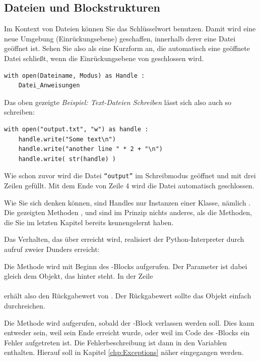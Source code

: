 \subsection{Dateien und Blockstrukturen}
Im Kontext von Dateien können Sie das Schlüsselwort  benutzen. Damit wird eine neue Umgebung (Einrückungsebene) geschaffen, innerhalb derer eine Datei geöffnet ist. Sehen Sie also  als eine Kurzform an, die automatisch eine geöffnete Datei schließt, wenn die Einrückungsebene von  geschlossen wird.

\begin{codebox}
\begin{verbatim}
with open(Dateiname, Modus) as Handle :
    Datei_Anweisungen
\end{verbatim}
\end{codebox}

Das oben gezeigte \emph{Beispiel: Text-Dateien Schreiben} lässt sich also auch so schreiben:
\begin{codebox}
\begin{verbatim}
with open("output.txt", "w") as handle :
    handle.write("Some text\n")
    handle.write("another line " * 2 + "\n")
    handle.write( str(handle) )
\end{verbatim}
\end{codebox}

Wie schon zuvor wird die Datei \texttt{\enquote{output}} im Schreibmodus geöffnet und mit drei Zeilen gefüllt. Mit dem Ende von Zeile 4 wird die Datei automatisch geschlossen.

\begin{hintbox}
Wie Sie sich denken können, sind Handles nur Instanzen einer Klasse, nämlich . Die gezeigten Methoden ,  und  sind im Prinzip nichts anderes, als die Methoden, die Sie im letzten Kapitel bereits kennengelernt haben.

Das Verhalten, das über  erreicht wird, realisiert der Python-Interpreter durch aufruf zweier Dunders erreicht:

Die Methode  wird mit Beginn des -Blocks aufgerufen. Der Parameter  ist dabei gleich dem Objekt, das hinter  steht. In der Zeile\\
\\
erhält  also den Rückgabewert von . Der Rückgabewert sollte das Objekt  einfach durchreichen.

Die Methode  wird aufgerufen, sobald der -Block verlassen werden soll. Dies kann entweder sein, weil sein Ende erreicht wurde, oder weil im Code des -Blocks ein Fehler aufgetreten ist. Die Fehlerbeschreibung ist dann in den Variablen  enthalten. Hierauf soll in Kapitel \ref{chp:Exceptions} näher eingegangen werden.
\end{hintbox}

